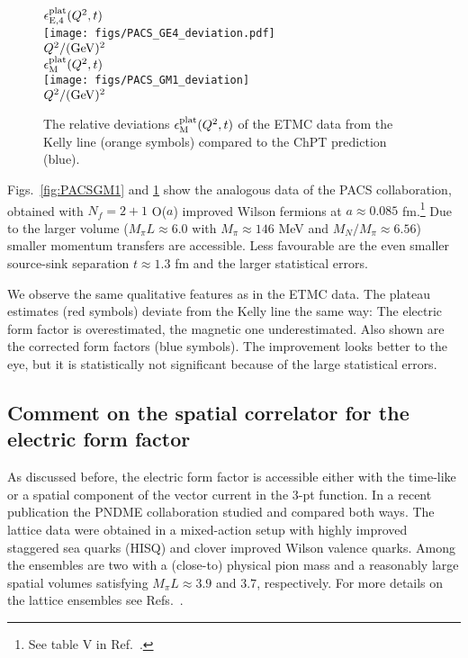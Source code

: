 \documentclass[11pt,prd,aps,showpacs,eqsecnum,floatfix,nofootinbib,preprint,tightenlines]{revtex4}
\begin{document}
% 
\begin{figure}[p]
\begin{center}
$\epsilon^{\rm plat}_{\rm E,4}(Q^2,t)$\\[1ex]
\texttt{[image: figs/PACS\_GE4\_deviation.pdf]}\\[0.6ex]
$Q^2/({\rm GeV})^2$\\[4ex]
$\epsilon^{\rm plat}_{\rm M}(Q^2,t)$\\[1ex]
\texttt{[image: figs/PACS\_GM1\_deviation]}\\[0.6ex]
$Q^2/({\rm GeV})^2$\\[0.8ex]
\caption{\label{fig:PACSGM1dev} The relative deviations $\epsilon^{\rm plat}_{\rm M}(Q^2,t)$ 
of the ETMC data \cite{Alexandrou:2018sjm} from the Kelly line (orange symbols) compared to the ChPT prediction (blue).
}
\end{center}
\end{figure}

Figs.\ \ref{fig:PACSGM1} and \ref{fig:PACSGM1dev} show the analogous data of the PACS collaboration, obtained with $N_f=2+1$ O($a$) improved Wilson fermions at $a\approx 0.085$ fm.\footnote{See table V in Ref.\ \cite{Ishikawa:2018rew}.} Due to the larger volume ($M_{\pi}L\approx 6.0$ with $M_{\pi} \approx146$ MeV and $M_N/M_{\pi}\approx 6.56$) smaller momentum transfers are accessible. Less favourable are the even smaller source-sink separation $t\approx 1.3$ fm and the larger statistical errors.

We observe the same qualitative features as in the ETMC data. The plateau estimates (red symbols) deviate from the Kelly line the same way: The electric form factor is overestimated, the magnetic one underestimated. Also shown are the corrected form factors (blue symbols). The improvement looks better to the eye, but it is statistically not significant because of the large statistical errors. 

\subsection{Comment on the spatial correlator for the electric form factor}

As discussed before, the electric form factor is accessible either with the time-like or a spatial component of the vector current in the 3-pt function. 
In a recent publication \cite{Jang:2019jkn} the PNDME collaboration studied and compared both ways.
The lattice data were obtained in a mixed-action setup with 
highly improved staggered sea quarks (HISQ) and clover improved Wilson valence quarks.
Among the ensembles are two with a (close-to) physical pion mass and a reasonably large spatial volumes satisfying $M_{\pi}L\approx3.9$ and $3.7$, respectively.  
For more details on the lattice ensembles see Refs.\ \cite{Jang:2019jkn,Gupta:2018qil}. 
\end{document}
